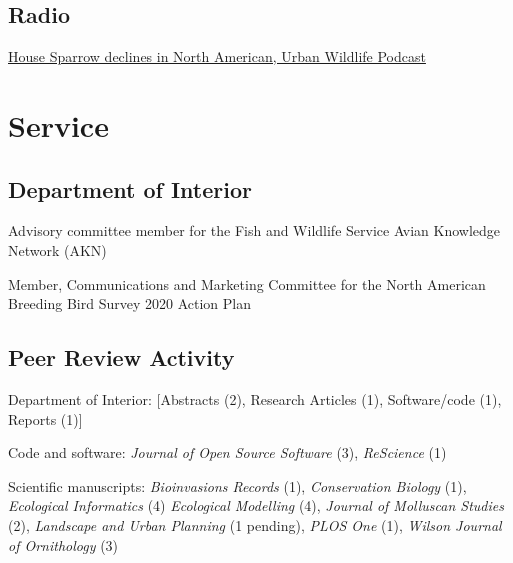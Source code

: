 \documentclass[11pt,]{article}
\providecommand{\tightlist}{%
  \setlength{\itemsep}{0pt}\setlength{\parskip}{0pt}}
\renewenvironment{itemize}{
 \begin{list}{- }{
   \setlength{\leftmargin}{1.5em}
   \setlength{\itemsep}{0pt}
 }
}{
 \end{list}
}
\begin{document}
\hypertarget{radio}{%
\subsection{Radio}\label{radio}}

\begin{itemize}
\tightlist
\item
  \href{http://www.urbanwildlifecast.com/?p=139}{House Sparrow declines
  in North American, Urban Wildlife Podcast}
\end{itemize}

\hypertarget{service}{%
\section{Service}\label{service}}

\hypertarget{department-of-interior}{%
\subsection{Department of Interior}\label{department-of-interior}}

\begin{itemize}
\tightlist
\item
  Advisory committee member for the Fish and Wildlife Service Avian
  Knowledge Network (AKN)
\item
  Member, Communications and Marketing Committee for the North American
  Breeding Bird Survey 2020 Action Plan
\end{itemize}

\hypertarget{peer-review-activity}{%
\subsection{Peer Review Activity}\label{peer-review-activity}}

\begin{itemize}
\tightlist
\item
  Department of Interior: {[}Abstracts (2), Research Articles (1),
  Software/code (1), Reports (1){]}
\item
  Code and software: \emph{Journal of Open Source Software} (3),
  \emph{ReScience} (1)
\item
  Scientific manuscripts: \emph{Bioinvasions Records} (1),
  \emph{Conservation Biology} (1), \emph{Ecological Informatics} (4)
  \emph{Ecological Modelling} (4), \emph{Journal of Molluscan Studies}
  (2), \emph{Landscape and Urban Planning} (1 pending), \emph{PLOS One}
  (1), \emph{Wilson Journal of Ornithology} (3)
\end{itemize}
\end{document}
